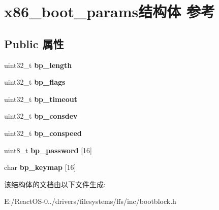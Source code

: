 \hypertarget{structx86__boot__params}{}\section{x86\+\_\+boot\+\_\+params结构体 参考}
\label{structx86__boot__params}
\subsection*{Public 属性}
\begin{DoxyCompactItemize}
\item 
\mbox{\label{structx86__boot__params_a9181050d8334e62d8442f4bd1575050f}} 
uint32\+\_\+t {\bfseries bp\+\_\+length}
\item 
\mbox{\label{structx86__boot__params_a0731e729bd312727cb4e4c0afd13632b}} 
uint32\+\_\+t {\bfseries bp\+\_\+flags}
\item 
\mbox{\label{structx86__boot__params_ad8a224c64d656a91a31b42bad5a544a3}} 
uint32\+\_\+t {\bfseries bp\+\_\+timeout}
\item 
\mbox{\label{structx86__boot__params_a5f6268c22c27bde5085ee3af1fdcd70a}} 
uint32\+\_\+t {\bfseries bp\+\_\+consdev}
\item 
\mbox{\label{structx86__boot__params_a42f9fe3fe0f308cf5157862de76a1500}} 
uint32\+\_\+t {\bfseries bp\+\_\+conspeed}
\item 
\mbox{\label{structx86__boot__params_acd99e05f6a0ac978a54786c43c875fa0}} 
uint8\+\_\+t {\bfseries bp\+\_\+password} \mbox{[}16\mbox{]}
\item 
\mbox{\label{structx86__boot__params_a0d6e58c779083e1a7b327c845ab09672}} 
char {\bfseries bp\+\_\+keymap} \mbox{[}16\mbox{]}
\end{DoxyCompactItemize}


该结构体的文档由以下文件生成\+:\begin{DoxyCompactItemize}
\item 
E\+:/\+React\+O\+S-\/0../drivers/filesystems/ffs/inc/bootblock.\+h\end{DoxyCompactItemize}
